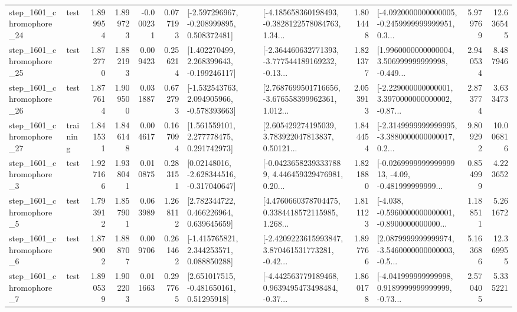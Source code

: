 \begin{tabular}{llrrrrllrlrr}
 step\_1601\_chromophore\_24 &      test &      1.899954 &    1.899723 &     -0.000231 &  0.077193 &   [-2.597296967, -0.208999895, 0.508372481] &  [-4.185658360198493, -0.3828122578084763, 1.34... &       1.801448 &  [-4.0920000000000005, -0.2459999999999951, 0.3... &            5.979769 &         12.636545 \\
 step\_1601\_chromophore\_25 &      test &      1.872770 &    1.882193 &      0.009423 &  0.256214 &    [1.402270499, 2.268399643, -0.199246117] &  [-2.364460632771393, -3.777544189169232, -0.13... &       1.821377 &  [1.9960000000000004, 3.506999999999998, -0.449... &            2.940534 &          8.487946 \\
 step\_1601\_chromophore\_26 &      test &      1.877614 &    1.909500 &      0.031887 &  0.672793 &   [-1.532543763, 2.094905966, -0.578393663] &  [2.7687699501716656, -3.676558399962361, 1.012... &       2.053913 &  [-2.229000000000001, 3.3970000000000002, -0.87... &            2.873774 &          3.633473 \\
 step\_1601\_chromophore\_27 &  training &      1.841531 &    1.846148 &      0.004617 &  0.167094 &     [1.561559101, 2.277778475, 0.291742973] &  [2.605429274195039, 3.783922047813837, 0.50121... &       1.844454 &  [-2.3149999999999995, -3.3880000000000017, 0.2... &            9.809292 &         10.006816 \\
  step\_1601\_chromophore\_3 &      test &      1.927166 &    1.938041 &      0.010875 &  0.283151 &    [0.02148016, -2.628344516, -0.317040647] &  [-0.04236582393337889, 4.446459329476981, 0.20... &       1.821880 &  [-0.026999999999999913, -4.09, -0.481999999999... &            0.854999 &          4.223652 \\
  step\_1601\_chromophore\_5 &      test &      1.793912 &    1.857901 &      0.063989 &  1.268112 &     [2.782344722, 0.466226964, 0.639645659] &  [4.4760660378704475, 0.3384418572115985, 1.268... &       1.811123 &  [-4.038, -0.5960000000000001, -0.8900000000000... &            1.188511 &          5.261672 \\
  step\_1601\_chromophore\_6 &      test &      1.879002 &    1.888707 &      0.009706 &  0.261462 &    [-1.415765821, 2.344253571, 0.088850288] &  [-2.4209223615993847, 3.870461531773281, -0.42... &       1.897766 &  [2.0879999999999974, -3.5460000000000003, -0.5... &            5.163686 &         12.369955 \\
  step\_1601\_chromophore\_7 &      test &      1.890539 &    1.902203 &      0.011663 &  0.297765 &     [2.651017515, -0.481650161, 0.51295918] &  [-4.442563779189468, 0.9639495473498484, -0.37... &       1.860178 &  [-4.041999999999998, 0.9189999999999999, -0.73... &            2.570405 &          5.335221 \\

\end{tabular}
